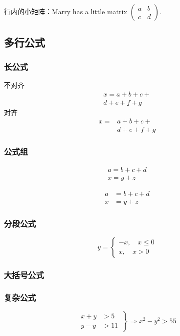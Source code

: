 行内的小矩阵：Marry has a little matrix $ ( \begin{smallmatrix} a&b\\c&d \end{smallmatrix} ) $.

\subsection{多行公式}

\subsubsection{长公式}
不对齐
\begin{multline}
x = a+b+c+{} \\
d+e+f+g
\end{multline}
对齐
\[\begin{aligned}
x ={}& a+b+c+{} \\
&d+e+f+g
\end{aligned}\]

\subsubsection{公式组}
\begin{gather}
a = b+c+d \\
x = y+z
\end{gather}

\begin{align}
a &= b+c+d \\
x &= y+z
\end{align}

\subsubsection{分段公式}
\begin{equation}
    y= \begin{cases}
    -x,\quad x\leq 0 \\
    x,\quad x>0
    \end{cases} 
\end{equation}

\subsubsection{大括号公式}



\subsubsection{复杂公式}
\begin{equation}
\left.
\begin{aligned}
x+y &> 5 \\
y-y &> 11
\end{aligned}
\ \right\}\Rightarrow x^2 - y^2 > 55
\end{equation}

